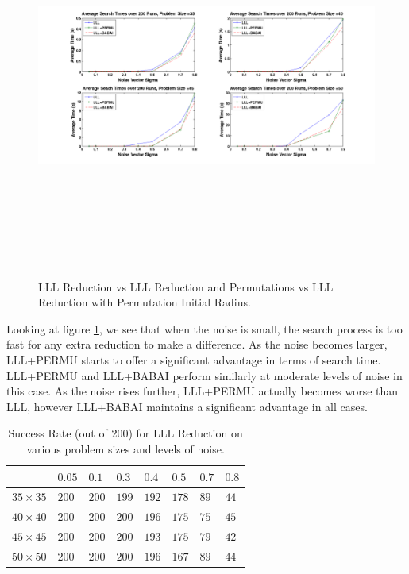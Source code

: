 \documentclass[12pt,Bold,letterpaper]{mcgilletdclass}
\begin{document}
\begin{figure}
\centering
\includegraphics[width=6.5in,height=5in]{lllvspermuvsbabai.png}
\caption{LLL Reduction vs LLL Reduction and Permutations vs LLL Reduction with Permutation Initial Radius.}
\label{fig:LLLvsPermuvsBabai}
\end{figure}

Looking at figure \ref{fig:LLLvsPermuvsBabai}, we see that when the noise is small, the search process is too fast for any extra reduction to make a difference. As the noise becomes larger, LLL+PERMU starts to offer a significant advantage in terms of search time. LLL+PERMU and LLL+BABAI perform similarly at moderate levels of noise in this case. As the noise rises further, LLL+PERMU actually becomes worse than LLL, however LLL+BABAI maintains a significant advantage in all cases.

\begin{table} \label{tab:successRateLLL}
\caption{Success Rate (out of 200) for LLL Reduction on various problem sizes and levels of noise.}
\begin{tabular}{|l|l|l|l|l|l|l|l|} 
\hline
 &              $0.05$ & $0.1$ & $0.3$ & $0.4$ & $0.5$ & $0.7$ & $0.8$ \\ \hline
$35 \times 35$& $200$  & $200$ & $199$ & $192$ & $178$ & $89$  & $44$\\ \hline
$40 \times 40$& $200$  & $200$ & $200$ & $196$ & $175$ & $75$  & $45$\\ \hline
$45 \times 45$& $200$  & $200$ & $200$ & $193$ & $175$ & $79$  & $42$\\ \hline
$50 \times 50$& $200$  & $200$ & $200$ & $196$ & $167$ & $89$  & $44$\\
\hline
\end{tabular}
\end{table}
\end{document}
